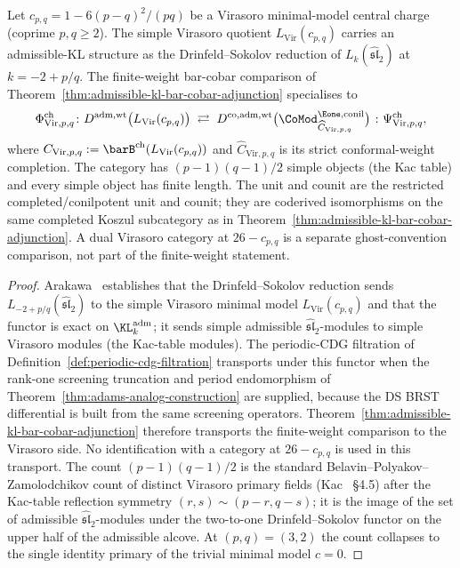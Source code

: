 \begin{corollary}
\label{cor:class-M-admissible-minimal-model}
%
Let $c_{p,q} = 1 - 6(p-q)^2/(pq)$ be a Virasoro minimal-model
central charge \textup{(}coprime $p, q \geq 2$\textup{)}. The
simple Virasoro quotient $L_{\mathrm{Vir}}(c_{p,q})$ carries an
admissible-KL structure as the Drinfeld--Sokolov reduction of
$L_k(\widehat{\mathfrak{sl}}_2)$ at $k = -2 + p/q$.  The
finite-weight bar-cobar comparison of
Theorem~\ref{thm:admissible-kl-bar-cobar-adjunction} specialises to
\begin{equation}\label{eq:minimal-model-kl-adjunction}
\Phi^{\mathrm{ch}}_{\mathrm{Vir},p,q}\colon
D^{\mathrm{adm,wt}}\bigl(L_{\mathrm{Vir}}(c_{p,q})\bigr)
\;\rightleftarrows\;
D^{\mathrm{co},\mathrm{adm,wt}}
\bigl(\CoMod^{\Eone,\mathrm{conil}}_{\widehat C_{\mathrm{Vir},p,q}}\bigr)
\;\colon \Psi^{\mathrm{ch}}_{\mathrm{Vir},p,q},
\end{equation}
where
$C_{\mathrm{Vir},p,q}:=\barB^{\mathrm{ch}}
(L_{\mathrm{Vir}}(c_{p,q}))$ and
$\widehat C_{\mathrm{Vir},p,q}$ is its strict conformal-weight
completion.  The category has
$(p-1)(q-1)/2$ simple objects \textup{(}the Kac table\textup{)} and
every simple object has finite length.  The unit and counit are the
restricted completed/conilpotent unit and counit; they are
coderived isomorphisms on the same completed Koszul subcategory as in
Theorem~\ref{thm:admissible-kl-bar-cobar-adjunction}.  A dual
Virasoro category at $26-c_{p,q}$ is a separate ghost-convention
comparison, not part of the finite-weight statement.
\end{corollary}

\begin{proof}
Arakawa~\cite{Arakawa15} establishes that the Drinfeld--Sokolov
reduction sends $L_{-2+p/q}(\widehat{\mathfrak{sl}}_2)$ to the
simple Virasoro minimal model $L_{\mathrm{Vir}}(c_{p,q})$ and that
the functor is exact on $\KL_k^{\mathrm{adm}}$; it sends simple
admissible $\widehat{\mathfrak{sl}}_2$-modules to simple Virasoro
modules \textup{(}the Kac-table modules\textup{)}. The periodic-CDG
filtration of Definition~\ref{def:periodic-cdg-filtration} transports
under this functor when the rank-one screening truncation and period
endomorphism of Theorem~\ref{thm:adams-analog-construction} are supplied,
because the DS BRST differential is built from the same screening
operators.  Theorem~\ref{thm:admissible-kl-bar-cobar-adjunction}
therefore transports the finite-weight comparison to the Virasoro
side.  No identification with a category at $26-c_{p,q}$ is used in
this transport.
The count $(p-1)(q-1)/2$ is the standard Belavin--Polyakov--Zamolodchikov
count of distinct Virasoro primary fields
\textup{(}Kac~\cite{Kac98} \S4.5\textup{)} after the Kac-table
reflection symmetry $(r, s) \sim (p-r, q-s)$; it is the image of the
set of admissible $\widehat{\mathfrak{sl}}_2$-modules under the
two-to-one Drinfeld--Sokolov functor on the upper half of the
admissible alcove. At $(p, q) = (3, 2)$ the count collapses to the
single identity primary of the trivial minimal model $c = 0$.
\end{proof}

